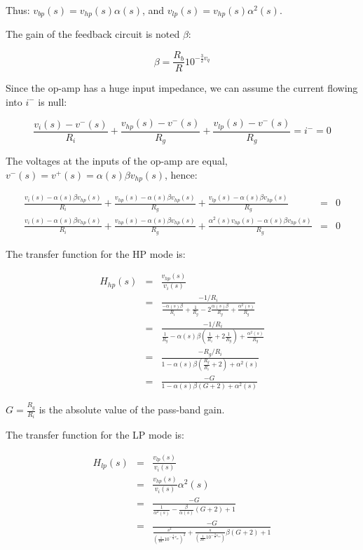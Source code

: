 \documentclass[a4paper,11pt]{article}
\begin{document}
Thus: $v_{bp}(s) = v_{hp}(s) \alpha(s)$, and $v_{lp}(s) = v_{hp}(s) \alpha^2(s)$.

The gain of the feedback circuit is noted $\beta$:

\begin{equation}
\beta = \frac{R_b}{R} 10^{-\frac{3}{2} v_{q}}
\end{equation}

Since the op-amp has a huge input impedance, we can assume the current flowing into $i^-$ is null:

\begin{equation}
\frac{v_i(s) - v^-(s)}{R_i} + \frac{v_{hp}(s) - v^-(s)}{R_g} + \frac{v_{lp}(s) - v^-(s)}{R_g} = i^- = 0
\end{equation}


The voltages at the inputs of the op-amp are equal, $v^-(s) = v^+(s) = \alpha(s) \beta v_{hp}(s)$, hence:

\begin{eqnarray}
\frac{v_i(s) - \alpha(s) \beta v_{hp}(s)}{R_i} + \frac{v_{hp}(s) - \alpha(s) \beta v_{hp}(s)}{R_g} + \frac{v_{lp}(s) - \alpha(s) \beta v_{hp}(s)}{R_g} &=& 0 \\
\frac{v_i(s) - \alpha(s) \beta v_{hp}(s)}{R_i} + \frac{v_{hp}(s) - \alpha(s) \beta v_{hp}(s)}{R_g} + \frac{\alpha^2(s) v_{hp}(s) - \alpha(s) \beta v_{hp}(s)}{R_g} &=& 0
\end{eqnarray}

The transfer function for the HP mode is:

\begin{eqnarray}
H_{hp}(s) &=& \frac{v_{hp}(s)}{v_i(s)} \\
 &=& \frac{-1 / R_i}{\frac{-\alpha(s) \beta}{R_i} + \frac{1}{R_g} - 2 \frac{\alpha(s) \beta}{R_g} + \frac{\alpha^2(s)}{R_g}} \\
 &=& \frac{-1 / R_i}{\frac{1}{R_g} - \alpha(s) \beta \left(\frac{1}{R_i} + 2 \frac{1}{R_g}\right) + \frac{\alpha^2(s)}{R_g}} \\
 &=& \frac{-R_g / R_i}{1 - \alpha(s) \beta \left(\frac{R_g}{R_i} + 2\right) + \alpha^2(s)} \\
 &=& \frac{-G}{1 - \alpha(s) \beta \left(G + 2\right) + \alpha^2(s)}
\end{eqnarray}

$G = \frac{R_g}{R_i}$ is the absolute value of the pass-band gain.

The transfer function for the LP mode is:

\begin{eqnarray}
H_{lp}(s) &=& \frac{v_{lp}(s)}{v_i(s)} \\
 &=& \frac{v_{hp}(s)}{v_i(s)} \alpha^2(s) \\
 &=& \frac{-G}{\frac{1}{\alpha^2(s)} - \frac{\beta}{\alpha(s)} (G + 2) + 1} \\
 &=& \frac{-G}{\frac{s^2}{{\left(\frac{1}{RC} 10 ^ {-\frac{3}{2} v_{cv}}\right)}^2} + \frac{s}{{\left(\frac{1}{RC} 10 ^ {-\frac{3}{2} v_{cv}}\right)}} \beta (G + 2) + 1}
\end{eqnarray}
\end{document}
